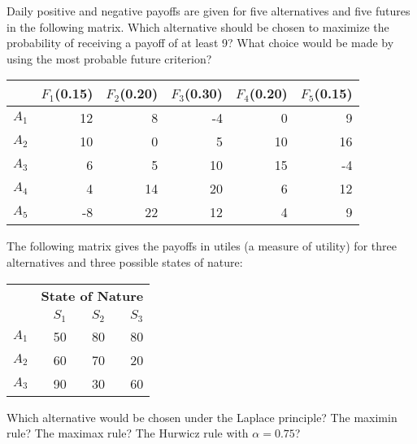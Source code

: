\begin{exercises}
    \begin{exercise}
    \label{sea-07-37}
        Daily positive and negative payoffs are given for five alternatives and five futures in the following matrix. Which alternative should be chosen to maximize the probability of receiving a payoff of at least 9? What choice would be made by using the most probable future criterion?
        \begin{table}[h]
        \centering
        \begin{tabular}{r r r r r r}
        \toprule
         & \textbf{$F_1$(0.15)} & \textbf{$F_2$(0.20)} & \textbf{$F_3$(0.30)} & \textbf{$F_4$(0.20)} & \textbf{$F_5$(0.15)} \\
        \midrule
        $A_1$ & 12 &  8 & -4 &  0 &  9 \\
        $A_2$ & 10 &  0 &  5 & 10 & 16 \\
        $A_3$ &  6 &  5 & 10 & 15 & -4 \\
        $A_4$ &  4 & 14 & 20 &  6 & 12 \\
        $A_5$ & -8 & 22 & 12 &  4 &  9 \\
        \bottomrule
        \end{tabular}
        \label{tab:sea-07-37} %
        \end{table}
    \end{exercise}
    \begin{solution}
    \end{solution}
    
    \begin{exercise}
    \label{sea-07-38}
        The following matrix gives the payoffs in utiles (a measure of utility) for three alternatives and three possible states of nature:
        \begin{table}[h]
        \centering
        \begin{tabular}{r r r r}
        \toprule
         & \multicolumn{3}{c}{\textbf{State of Nature}} \\
         & \textbf{$S_1$} & \textbf{$S_2$} & \textbf{$S_3$} \\
        \midrule
        $A_1$ & 50 & 80 & 80 \\
        $A_2$ & 60 & 70 & 20 \\
        $A_3$ & 90 & 30 & 60 \\
        \bottomrule
        \end{tabular}
        \label{tab:sea-07-38} %
        \end{table}
        Which alternative would be chosen under the Laplace principle? The maximin rule? The maximax rule? The Hurwicz rule with  $\alpha=0.75$?
    \end{exercise}
    \begin{solution}
    \end{solution}
    

\end{exercises}
